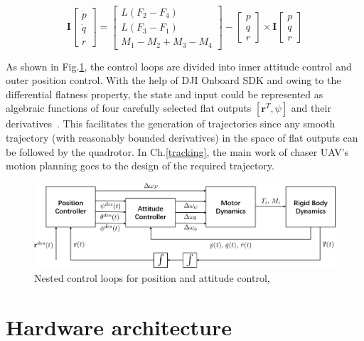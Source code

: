 \begin{equation}\label{eq:euler}
\mathbf{I}\begin{bmatrix}\dot{p}\\\dot{q}\\\dot{r}\end{bmatrix}=\begin{bmatrix}L(F_2-F_4)\\L(F_3-F_1)\\M_1-M_2+M_3-M_4\end{bmatrix}-\begin{bmatrix}p\\q\\r\end{bmatrix}\times
\mathbf{I}\begin{bmatrix}p\\q\\r\end{bmatrix}
\end{equation}

As shown in Fig.\ref{fig:nest}, the control loops are divided into inner attitude control and outer position control. With the help of DJI Onboard SDK and owing to the differential flatness property, the state and input could be represented as algebraic functions of four carefully selected flat outputs $[\mathbf{r}^T, \psi]$ and their derivatives~\cite{Snap}. This facilitates the generation of trajectories since any smooth trajectory (with reasonably bounded derivatives) in the space of flat outputs can be followed by the quadrotor. In Ch.\ref{tracking}, the main work of chaser UAV's motion planning goes to the design of the required trajectory.

\begin{figure}[htb]
  \centering
  \includegraphics[width=1.0\textwidth]{figure/chapter_2/nest.png}
  \caption{Nested control loops for position and attitude control,~\cite{GRASP}}
  \label{fig:nest}
\end{figure}

\section{Hardware architecture}\label{hardware}

